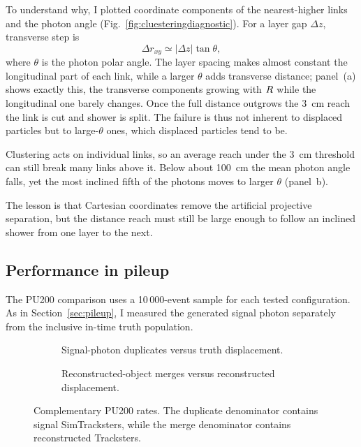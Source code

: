 To understand why, I plotted coordinate components of the nearest-higher
links and the photon angle (Fig.~\ref{fig:cluesteringdiagnostic}). For a layer gap $\Delta z$, transverse step is
\begin{equation}
 \Delta r_{xy}\simeq|\Delta z|\tan\theta,
 \label{eq:cluesteringangle}
\end{equation}
where $\theta$ is the photon polar angle. The layer spacing makes almost constant the
longitudinal part of each link, while a larger $\theta$ adds transverse
distance; panel~(a) shows exactly this, the transverse components growing with
$R$ while the longitudinal one barely changes. Once the full distance
outgrows the \SI{3}{cm} reach the link is cut and shower is split. The failure is thus not
inherent to displaced particles but to large-$\theta$ ones, which displaced
particles tend to be.

Clustering acts on individual links, so an average reach under the \SI{3}{cm}
threshold can still break many links above it. Below about \SI{100}{cm} the mean photon
angle falls, yet the most inclined fifth of the photons moves to larger $\theta$
(panel~b).

The lesson is that Cartesian coordinates remove the artificial projective separation, but the distance reach must still be large enough to follow an inclined shower from one
layer to the next.

\subsection{Performance in pileup}

The PU200 comparison uses a 10\,000-event sample for each tested
configuration. As in Section~\ref{sec:pileup}, I measured the generated signal
photon separately from the inclusive in-time truth population.



\begin{figure}[!tp]
  \centering
  \begin{subfigure}{0.49\textwidth}
    \caption{Signal-photon duplicates versus truth displacement.}
  \end{subfigure}\hfill
  \begin{subfigure}{0.49\textwidth}
    \caption{Reconstructed-object merges versus reconstructed displacement.}
  \end{subfigure}
  \caption{Complementary PU200 rates. The duplicate denominator contains
  signal SimTracksters, while the merge denominator contains reconstructed
  Tracksters.}
  \label{fig:cluesteringrates}
\end{figure}

